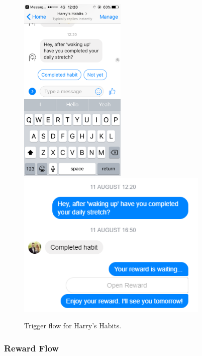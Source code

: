 \begin{figure}[H]
  \centering
  \includegraphics[width=2in]{resources/design/media/3.png}
  \hspace{10px}
  \includegraphics[width=3.6in]{resources/design/completed_habit.png}
  \caption{Trigger flow for Harry's Habits.}
  \label{fig:trigger_flow_screenshots}
\end{figure}


\subsubsection{Reward Flow} \label{reward_flow}

